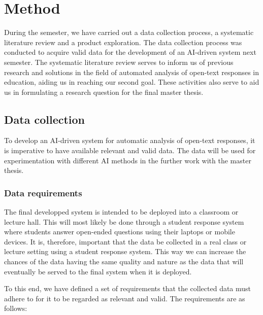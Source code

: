 \chapter{Method}\label{sec:method}

\begin{comment}
The method chapter should describe in detail which activities you undertake to answer the research questions presented in the introduction, and why they were chosen. This includes detailed descriptions of experiments, surveys, computations, data analysis, statistical tests etc.

Talk about the data used, and why we collected our own
\end{comment}

During the semester, we have carried out a data collection process, a systematic literature review and a product exploration. The data collection process was conducted to acquire valid data for the development of an AI-driven system next semester. The systematic literature review serves to inform us of previous research and solutions in the field of automated analysis of open-text responses in education, aiding us in reaching our second goal. These activities also serve to aid us in formulating a research question for the final master thesis.


\section{Data collection}
To develop an AI-driven system for automatic analysis of open-text responses, it is imperative to have available relevant and valid data. The data will be used for experimentation with different AI methods in the further work with the master thesis.

\subsection{Data requirements}
The final developped system is intended to be deployed into a classroom or lecture hall. This will most likely be done through a student response system where students answer open-ended questions using their laptops or mobile devices. It is, therefore, important that the data be collected in a real class or lecture setting using a student response system. This way we can increase the chances of the data having the same quality and nature as the data that will eventually be served to the final system when it is deployed.

To this end, we have defined a set of requirements that the collected data must adhere to for it to be regarded as relevant and valid. The requirements are as follows:

